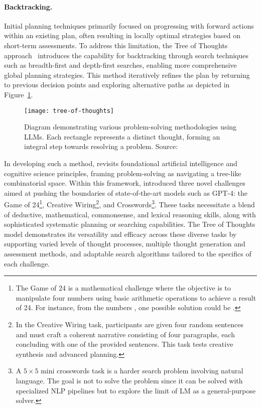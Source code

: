 \paragraph{Backtracking.}
\label{par:backtracking}

Initial planning techniques primarily focused on progressing with forward actions within an existing plan, often resulting in locally optimal strategies based on short-term assessments.
To address this limitation, the Tree of Thoughts approach~\cite{yao2023tree} introduces the capability for backtracking through search techniques such as breadth-first and depth-first searches, enabling more comprehensive global planning strategies.
This method iteratively refines the plan by returning to previous decision points and exploring alternative paths as depicted in Figure~\ref{fig:tree-of-thoughts}.

\begin{figure}[h!]
	\centering
	\texttt{[image: tree-of-thoughts]}
	\caption{Diagram demonstrating various problem-solving methodologies using LLMs. Each rectangle represents a distinct thought, forming an integral step towards resolving a problem. Source: \textcite{yao2023tree}}
	\label{fig:tree-of-thoughts}
\end{figure}

In developing such a method, \textcite{yao2023tree} revisits foundational artificial intelligence and cognitive science principles, framing problem-solving as navigating a tree-like combinatorial space.
Within this framework, \textcite{yao2023tree} introduced three novel challenges aimed at pushing the boundaries of state-of-the-art models such as GPT-4: the Game of 24\footnote{The Game of 24 is a mathematical challenge where the objective is to manipulate four numbers using basic arithmetic operations \code{$+-\times\div$} to achieve a result of 24. For instance, from the numbers , one possible solution could be .}, Creative Wiring\footnote{In the Creative Wiring task, participants are given four random sentences and must craft a coherent narrative consisting of four paragraphs, each concluding with one of the provided sentences. This task tests creative synthesis and advanced planning.}, and Crosswords\footnote{A $5\times5$ mini crosswords task is a harder search problem involving natural language. The goal is not to solve the problem since it can be solved with specialized NLP pipelines but to explore the limit of LM as a general-purpose solver.}.
These tasks necessitate a blend of deductive, mathematical, commonsense, and lexical reasoning skills, along with sophisticated systematic planning or searching capabilities.
The Tree of Thoughts model demonstrates its versatility and efficacy across these diverse tasks by supporting varied levels of thought processes, multiple thought generation and assessment methods, and adaptable search algorithms tailored to the specifics of each challenge.

